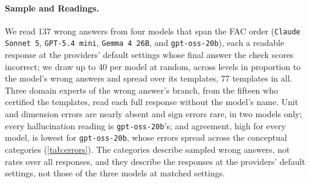 \paragraph{Sample and Readings.} We read 137 wrong answers from four models that span the FAC order
(\texttt{Claude Sonnet 5}, \texttt{GPT-5.4 mini}, \texttt{Gemma 4 26B}, and \texttt{gpt-oss-20b}),
each a readable response at the providers' default settings whose final answer the check scores
incorrect; we draw up to 40 per model at random, across levels in proportion to the model's wrong
answers and spread over its templates, 77 templates in all.
Three domain experts of the wrong answer's branch, from the fifteen who certified the templates,
read each full response without the model's name.
Unit and dimension errors are nearly absent and sign errors rare, in two models only; every
hallucination reading is \texttt{gpt-oss-20b}'s; and agreement, high for every model, is lowest for
\texttt{gpt-oss-20b}, whose errors spread across the conceptual categories (\autoref{tab:errors}).
The categories describe sampled wrong answers, not rates over all responses, and they describe the
responses at the providers' default settings, not those of the three models at matched settings.

